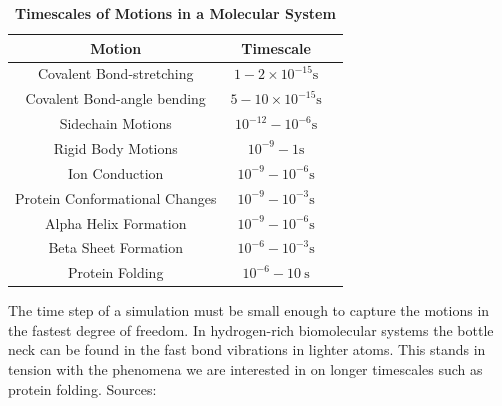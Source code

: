\begin{table}
	\label{timescales}
	\begin{center}   
		\begin{tabular}{ |c|c|c|}
			\hline
			Motion & Timescale \\
			\hline
			Covalent Bond-stretching & $1-2\times10^{-15}\text{s}$ \\
			Covalent Bond-angle bending & $5-10\times10^{-15}\text{s}$ \\ 
			Sidechain  Motions & $10 ^{-12}-10^{-6}\text{s}$ \\
			Rigid Body Motions & $10 ^{-9}-1\text{s}$ \\
			Ion Conduction & $10^{-9}-10^{-6}\text{s}$ \\
			Protein Conformational Changes & $10^{-9}-10^{-3}\text{s}$ \\
			Alpha Helix Formation & $10^{-9}-10^{-6}\text{s}$ \\
			Beta Sheet Formation & $10^{-6}-10^{-3}\text{s}$ \\
			Protein Folding & $10^{-6}-10\ \text{s}$ \\
			\hline
		\end{tabular}
\end{center}
	\captionsetup{singlelinecheck = false, justification=raggedright}
	\caption[Timescales of Motions in a Molecular System]{\textbf{Timescales of Motions in a Molecular System}} {The time step of a simulation must be small enough to capture the motions in the fastest degree of freedom. In hydrogen-rich biomolecular systems the bottle neck can be found in the fast bond vibrations in lighter atoms. This stands in tension with the phenomena we are interested in on longer timescales such as protein folding. Sources: \cite{leach2001}\cite{schlick2010}\cite{brooks1988}\cite{flood2019}\cite{werner2012}} \cite{feenstra1999}
\end{table}

